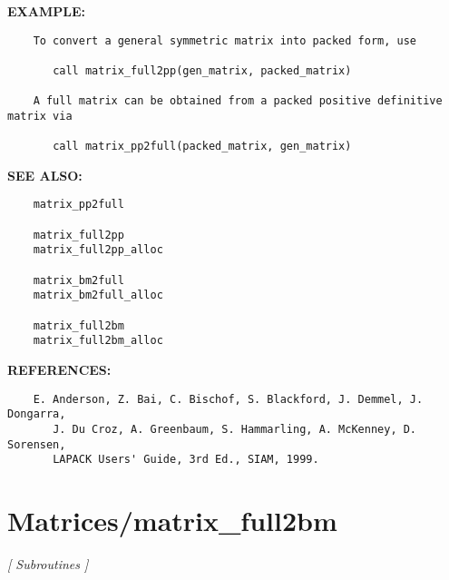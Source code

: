 \textbf{EXAMPLE:}\hspace{0.08in}\begin{Verbatim}
    To convert a general symmetric matrix into packed form, use

       call matrix_full2pp(gen_matrix, packed_matrix)

    A full matrix can be obtained from a packed positive definitive matrix via

       call matrix_pp2full(packed_matrix, gen_matrix)
\end{Verbatim}
\textbf{SEE ALSO:}\hspace{0.08in}\begin{Verbatim}
    matrix_pp2full

    matrix_full2pp
    matrix_full2pp_alloc

    matrix_bm2full
    matrix_bm2full_alloc

    matrix_full2bm
    matrix_full2bm_alloc
\end{Verbatim}
\textbf{REFERENCES:}\hspace{0.08in}\begin{Verbatim}
    E. Anderson, Z. Bai, C. Bischof, S. Blackford, J. Demmel, J. Dongarra,
       J. Du Croz, A. Greenbaum, S. Hammarling, A. McKenney, D. Sorensen,
       LAPACK Users' Guide, 3rd Ed., SIAM, 1999.
\end{Verbatim}
\section{Matrices/matrix\_full2bm}
\textsl{[ Subroutines ]}

